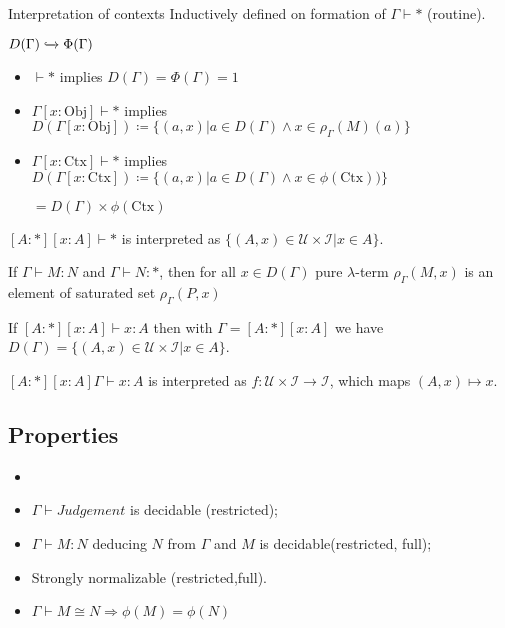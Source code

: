 \documentclass{beamer}
\begin{document}
\begin{frame}{Interpretation of contexts}
Inductively defined on formation of $\Gamma \vdash *$  (routine).

$D(\Gamma) \xhookrightarrow{} \Phi(\Gamma)$

\begin{itemize}
\item $\vdash *$ implies $D(\Gamma) = \Phi(\Gamma) = 1$

\item $\Gamma[x:\text{Obj}] \vdash * $ implies $D(\Gamma[x:\text{Obj}]) \coloneqq \{(a,x) | a \in D(\Gamma) \land x \in \rho_{\Gamma}(M)(a)\}$

\item $\Gamma[x:\text{Ctx}] \vdash * $ implies $D(\Gamma[x:\text{Ctx}]) \coloneqq \{(a,x) | a \in D(\Gamma) \land x \in \phi(\text{Ctx}))\} $ 

$= D(\Gamma) \times \phi(\text{Ctx})$
\end{itemize} 
\begin{example}
$[A: *][x:A] \vdash * $ is interpreted as $\{(A,x) \in \mathscr{U} \times \mathscr{I} | x\in A\}$.
\end{example}

\end{frame}

\begin{frame}

    
    If $\Gamma \vdash M: N$ and $\Gamma \vdash N : *$, then for all $x \in D(\Gamma)$ pure $\lambda$-term $\rho_{\Gamma}(M,x)$ is an element of saturated set $\rho_{\Gamma}(P,x)$  

    \begin{example}

If $[A:*][x:A] \vdash x:A$ then with $\Gamma = [A:*][x:A]$ we have $D(\Gamma)  = \{ (A,x) \in \mathscr{U} \times \mathscr{I} | x \in A \}$.

$[A:* ] [x:A] \Gamma \vdash x:A$ is interpreted as  $f: \mathscr{U} \times \mathscr{I} \rightarrow \mathscr{I}$, which maps $(A,x) \mapsto x$.
    \end{example}


\end{frame}
\subsection{Properties}

\begin{frame}
\begin{itemize}
\item 
\item $\Gamma \vdash Judgement$ is decidable (restricted);
\item $\Gamma \vdash M:N$ deducing $N$ from $\Gamma$ and $M$ is decidable(restricted, full);
\item Strongly normalizable (restricted,full).
\item $\Gamma \vdash M \cong N \Rightarrow \phi(M) = \phi(N)$
\end{itemize}
\end{frame}
\end{document}
